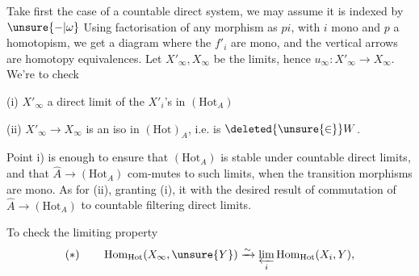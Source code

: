 Take first the case of a countable direct system, we may assume it is indexed by $\unsure{-|\omega}$
Using factorisation of any morphism as $pi$, with $i$ mono and $p$ a homotopism, we get a diagram
where the $f'_i$ are mono, and the vertical arrows are homotopy equivalences. Let $X'_\infty,X_\infty$ be the limits, hence $u_\infty:X'_\infty\longrightarrow X_\infty$. We're to check

(i) $X'_\infty$  a direct limit of the $X'_i$'s in $(\mathrm{Hot}_A)$

(ii) $X'_\infty\longrightarrow X_\infty$ is an iso in $(\mathrm{Hot})_A$, i.e. is $\deleted{\unsure{\in}}W$.

Point i) is enough  to ensure that $(\mathrm{Hot}_A)$ is stable under countable  direct limits, and that $\widehat A\longrightarrow(\mathrm{Hot}_A)$ com-mutes to such limits, when the transition morphisms are mono.  As for (ii), granting (i), it  with the desired result of commutation of $\widehat A\longrightarrow(\mathrm{Hot}_A)$ to countable filtering direct limits.

To check the limiting property
\[
(*)\qquad\operatorname{Hom}_{\mathrm{Hot}}(X_\infty,\unsure{Y})\xrightarrow{\sim}\varprojlim_i\operatorname{Hom}_{\mathrm{Hot}}(X_i,Y),
\]

